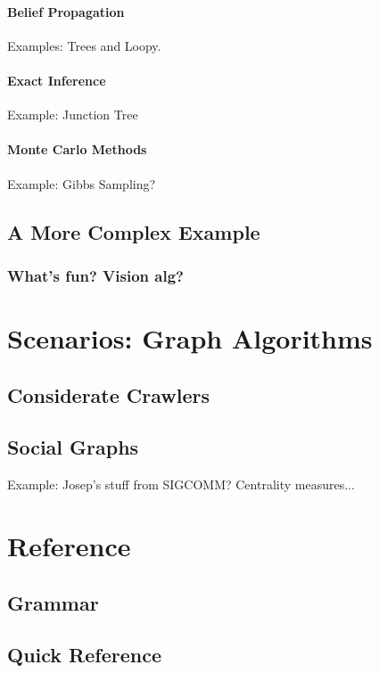 \documentclass[]{book}
\begin{document}
            \subsubsection{Belief Propagation}
            Examples: Trees and Loopy.
            \subsubsection{Exact Inference}
            Example: Junction Tree
            \subsubsection{Monte Carlo Methods}
            Example: Gibbs Sampling?
    \section{A More Complex Example}
        \subsection{What's fun?  Vision alg?}

\chapter{Scenarios: Graph Algorithms}
    \section{Considerate Crawlers}
    \section{Social Graphs}
    Example: Josep's stuff from SIGCOMM?  Centrality measures...
 
\chapter{Reference}
    \section{Grammar}
    \section{Quick Reference}
\end{document}
